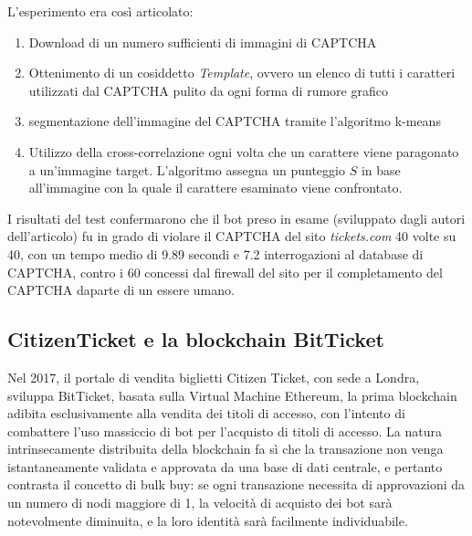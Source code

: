 L'esperimento era così articolato: 
\begin{enumerate}
\item Download di un numero sufficienti di immagini di CAPTCHA
\item Ottenimento di un cosiddetto \textit{Template}, ovvero un elenco di tutti i caratteri utilizzati dal CAPTCHA pulito da ogni forma di rumore grafico
\item segmentazione dell'immagine del CAPTCHA tramite l'algoritmo k-means
\item Utilizzo della cross-correlazione ogni volta che un carattere viene paragonato a un'immagine target. L'algoritmo assegna un punteggio $S$ in base all'immagine con la quale il carattere esaminato viene confrontato.
\end{enumerate}
I risultati del test confermarono che il bot preso in esame (sviluppato dagli autori dell'articolo) fu in grado di violare il CAPTCHA del sito \textit{tickets.com} 40 volte su 40, con un tempo medio di 9.89 secondi e 7.2 interrogazioni al database di CAPTCHA, contro i 60 concessi dal firewall del sito per il completamento del CAPTCHA daparte di un essere umano.
\subsection{CitizenTicket e la blockchain BitTicket}
Nel 2017, il portale di vendita biglietti Citizen Ticket, con sede a Londra, sviluppa BitTicket, basata sulla Virtual Machine Ethereum, la prima blockchain adibita esclusivamente alla vendita dei titoli di accesso, con l'intento di combattere l'uso massiccio di bot per l'acquisto di titoli di accesso. 
La natura intrinsecamente distribuita della blockchain fa sì che la transazione non venga istantaneamente validata e approvata da una base di dati centrale, e pertanto contrasta il concetto di bulk buy: se ogni transazione necessita di approvazioni da un numero di nodi maggiore di 1, la velocità di acquisto dei bot sarà notevolmente diminuita, e la loro identità sarà facilmente individuabile.
